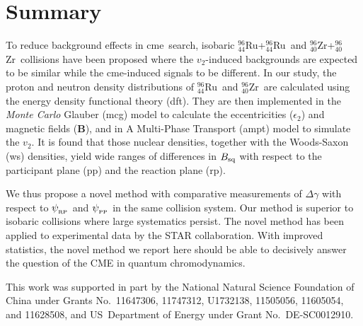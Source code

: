 \documentclass[3p,times,procedia]{elsarticle}
\newcommand {\dft}	{{\sc dft}}
\newcommand {\ampt}	{{\sc ampt}}
\newcommand {\mcg}	{{\sc mcg}}
\newcommand {\ws}	{{\sc ws}}
\newcommand {\cme}	{{\mbox{\sc cme}}}
\newcommand {\RP}	{{\sc rp}}
\newcommand {\PP}	{{\sc pp}}
\newcommand {\psiRP}	{\psi_{_{\rm RP}}}
\newcommand {\psiPP}	{\psi_{_{\rm PP}}}
\newcommand {\etwo}	{\epsilon_2}
\newcommand {\vv}	{v_2}
\newcommand {\Ru}	{$^{96}_{44}$Ru}
\newcommand {\Zr}	{$^{96}_{40}$Zr}
\newcommand {\Bbf}	{\mathbf{B}}
\newcommand {\Bsq}	{B_{\rm sq}}
\newcommand {\dg}	{\Delta\gamma}
\begin{document}
\section{Summary} 
To reduce background effects in \cme\ search, isobaric \Ru+\Ru\ and \Zr+\Zr\ collisions have been proposed where the $\vv$-induced backgrounds are expected to be similar while the \cme-induced signals to be different. In our  study, the proton and neutron density distributions of \Ru\ and \Zr\ are calculated using the energy density functional theory (\dft). They are then implemented in the {\em Monte Carlo} Glauber (\mcg) model to calculate the eccentricities ($\etwo$) and magnetic fields ($\Bbf$), and in A Multi-Phase Transport (\ampt) model to simulate the $\vv$. 
It is found that those nuclear densities, together with the Woods-Saxon (\ws) densities, yield wide ranges of differences in $\Bsq$ with respect to the participant plane (\PP) and the reaction plane (\RP). %

We thus propose a novel method with comparative measurements of $\dg$ with respect to $\psiRP$ and $\psiPP$ in the same collision system. Our method is superior to isobaric collisions where large systematics persist. The novel method has been applied to experimental data by the STAR collaboration.
With improved statistics, the novel method we report here should be able to decisively answer the question of the CME in quantum chromodynamics.

This work was supported in part by the National Natural Science Foundation of China under Grants No.~11647306, 11747312, U1732138, 11505056, 11605054, and 11628508, and US~Department of Energy under Grant No.~DE-SC0012910.


\end{document}
